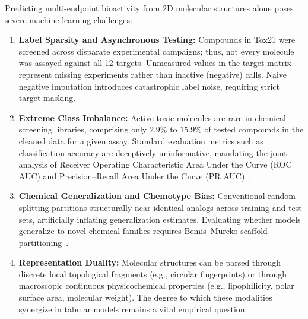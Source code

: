 Predicting multi-endpoint bioactivity from 2D molecular structures alone poses severe machine learning challenges:
\begin{enumerate}
    \item \textbf{Label Sparsity and Asynchronous Testing:} Compounds in Tox21 were screened across disparate experimental campaigns; thus, not every molecule was assayed against all 12 targets. Unmeasured values in the target matrix represent missing experiments rather than inactive (negative) calls. Naive negative imputation introduces catastrophic label noise, requiring strict target masking.
    \item \textbf{Extreme Class Imbalance:} Active toxic molecules are rare in chemical screening libraries, comprising only $2.9\%$ to $15.9\%$ of tested compounds in the cleaned data for a given assay. Standard evaluation metrics such as classification accuracy are deceptively uninformative, mandating the joint analysis of Receiver Operating Characteristic Area Under the Curve (ROC AUC) and Precision--Recall Area Under the Curve (PR AUC)~\cite{saito2015precision}.
    \item \textbf{Chemical Generalization and Chemotype Bias:} Conventional random splitting partitions structurally near-identical analogs across training and test sets, artificially inflating generalization estimates. Evaluating whether models generalize to novel chemical families requires Bemis--Murcko scaffold partitioning~\cite{bemis1996properties,wu2018moleculenet}.
    \item \textbf{Representation Duality:} Molecular structures can be parsed through discrete local topological fragments (e.g., circular fingerprints) or through macroscopic continuous physicochemical properties (e.g., lipophilicity, polar surface area, molecular weight). The degree to which these modalities synergize in tabular models remains a vital empirical question.
\end{enumerate}

